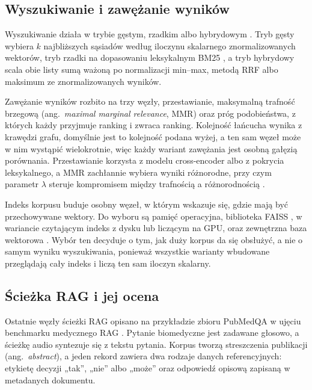 \subsection{Wyszukiwanie i zawężanie wyników}
Wyszukiwanie działa w trybie gęstym, rzadkim albo hybrydowym \cite{manning2008introduction}. Tryb
gęsty wybiera $k$ najbliższych sąsiadów według iloczynu skalarnego znormalizowanych wektorów, tryb
rzadki na dopasowaniu leksykalnym BM25 \cite{robertson2009probabilistic,
sparckjones1972statistical}, a tryb hybrydowy scala obie listy sumą ważoną po normalizacji
min--max, metodą RRF \cite{cormack2009rrf} albo maksimum ze znormalizowanych wyników.

Zawężanie wyników rozbito na trzy węzły, przestawianie, maksymalną trafność brzegową (ang.\
\textit{maximal marginal relevance}, MMR) oraz próg podobieństwa, z których każdy przyjmuje ranking
i zwraca ranking. Kolejność łańcucha wynika z krawędzi grafu, domyślnie jest to kolejność podana
wyżej, a ten sam węzeł może w nim wystąpić wielokrotnie, więc każdy wariant zawężania jest osobną
gałęzią porównania. Przestawianie korzysta z modelu cross-encoder
albo z pokrycia leksykalnego, a MMR zachłannie wybiera wyniki różnorodne, przy czym parametr
$\lambda$ steruje kompromisem między trafnością a różnorodnością \cite{carbonell1998mmr}.

Indeks korpusu buduje osobny węzeł, w którym wskazuje się, gdzie mają być przechowywane wektory.
Do wyboru są pamięć operacyjna, biblioteka FAISS \cite{johnson2019billion}, w wariancie
czytającym indeks z dysku lub liczącym na GPU, oraz zewnętrzna baza wektorowa
\cite{wang2021milvus}. Wybór ten decyduje o tym, jak duży korpus da się obsłużyć, a nie o samym
wyniku wyszukiwania, ponieważ wszystkie warianty wbudowane przeglądają cały indeks i liczą ten sam
iloczyn skalarny.

\subsection{Ścieżka RAG i jej ocena}
\label{sec:rag}
Ostatnie węzły ścieżki RAG opisano na przykładzie zbioru PubMedQA \cite{jin2019pubmedqa}
w ujęciu benchmarku medycznego RAG \cite{pubmed}. Pytanie biomedyczne jest zadawane głosowo, a ścieżkę
audio syntezuje się z tekstu pytania. Korpus tworzą streszczenia publikacji (ang.\
\textit{abstract}), a jeden rekord zawiera dwa rodzaje danych referencyjnych: etykietę decyzji
„tak'', „nie'' albo „może'' oraz odpowiedź opisową zapisaną w metadanych dokumentu.

